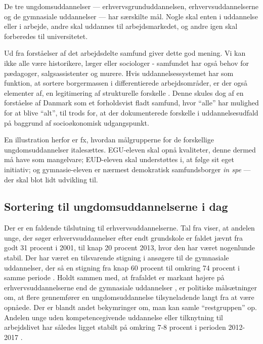 De tre ungdomsuddannelser --- erhvervsgrunduddannelsen, erhvervsuddannelserne og de gymnasiale uddannelser —  har særskilte mål. Nogle skal enten i uddannelse eller i arbejde, andre skal uddannes til arbejdsmarkedet, og andre igen skal forberedes til universitetet.

Ud fra forståelser af det arbejdsdelte samfund giver dette god mening.
Vi kan ikke alle være historikere, læger eller sociologer - samfundet har også behov for pædagoger, salgsassistenter og murere.
Hvis uddannelsessystemet har som funktion, at sortere borgermassen i differentierede arbejdsområder, er der også elementer af, en legitimering af strukturelle forskelle .
Denne  skules dog af en forståelse af Danmark som et forholdsvist fladt samfund, hvor “alle” har mulighed for at blive “alt”, til trods for, at der dokumenterede forskelle i uddannelsesudfald på baggrund af socioøkonomisk udgangspunkt.

En illustration herfor er fx, hvordan målgrupperne for de forskellige ungdomsuddannelser italesættes.
EGU-eleven skal opnå kvaliteter, denne dermed må have som mangelvare; EUD-eleven skal understøttes i, at følge sit eget initiativ; og gymnasie-eleven er nærmest demokratisk samfundsborger \textit{in spe} — der skal blot lidt udvikling til. 




\subsection{Sortering til ungdomsuddannelserne i dag}
\label{sec:sorting}
Der er en faldende tilslutning til erhvervsuddannelserne.
Tal fra \citeauthor{borne-ogundervisningsministerietSogning} viser, at andelen unge, der søger erhvervsuddannelser efter endt grundskole er faldet jævnt fra godt 31 procent i 2001, til knap 20 procent 2013, hvor den har været nogenlunde stabil.
Der har været en tilsvarende stigning i ansøgere til de gymnasiale uddannelser, der så en stigning fra knap 60 procent til omkring 74 procent i samme periode \autocite[s 5f]{undervisningsministerietog10klasseelevernes2017}.
Holdt sammen med, at frafaldet er markant højere på erhvervsuddannelserne end de gymnasiale uddannelser \autocite{danskegymnasierFuldforelseOgKarakterer2019}, er politiske målsætninger om, at flere gennemfører en ungdomsuddannelse tilsyneladende langt fra at være opnåede.
Der er blandt andet bekymringer om, man kan samle “restgruppen” op.
Andelen unge uden kompetencegivende uddannelse eller tilknytning til arbejdslivet har således ligget stabilt på omkring 7-8 procent i perioden 2012-2017 \autocite[s. 9]{andersenUngeUdenUddannelse2019}.

